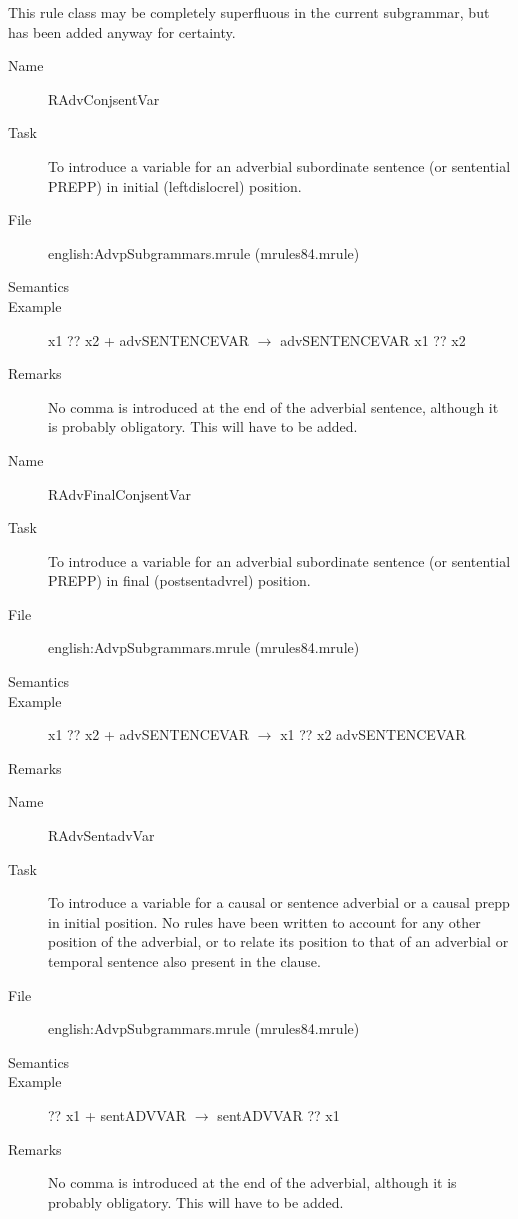 \begin{description}
\begin{description}
This rule class may be completely superfluous in the current subgrammar, but 
has been added anyway for certainty.

\vspace{1 cm}
\begin{description}
\item[Name] RAdvConjsentVar
\item[Task] To introduce a variable for an adverbial subordinate sentence (or 
sentential PREPP) in initial (leftdislocrel) position.
\item[File] english:AdvpSubgrammars.mrule (mrules84.mrule)
\item[Semantics]
\item[Example] x1 ?? x2 + advSENTENCEVAR $\rightarrow$ advSENTENCEVAR x1 ?? x2 
\item[Remarks] No comma is introduced at the end of the adverbial sentence, 
although it is probably obligatory. This will have to be added.
\end{description}

\vspace{1 cm}
\begin{description}
\item[Name] RAdvFinalConjsentVar
\item[Task] To introduce a variable for an adverbial subordinate sentence (or 
sentential PREPP) in final (postsentadvrel) position.
\item[File] english:AdvpSubgrammars.mrule (mrules84.mrule)
\item[Semantics]
\item[Example] 
x1 ?? x2 + advSENTENCEVAR $\rightarrow$ x1 ?? x2 advSENTENCEVAR 
\item[Remarks] 
\end{description}

\vspace{1 cm}
\begin{description}
\item[Name] RAdvSentadvVar
\item[Task] To introduce a variable for a causal or sentence adverbial or a 
causal prepp in 
initial position. No rules have been written to account for any other position 
of the adverbial, or to relate its position to that of an adverbial or temporal 
sentence also present in the clause.
\item[File] english:AdvpSubgrammars.mrule (mrules84.mrule)
\item[Semantics]
\item[Example] 
?? x1 + sentADVVAR $\rightarrow$ sentADVVAR ?? x1 
\item[Remarks] No comma is introduced at the end of the adverbial, 
although it is probably obligatory. This will have to be added.
\end{description}


\end{description}
\end{description}
